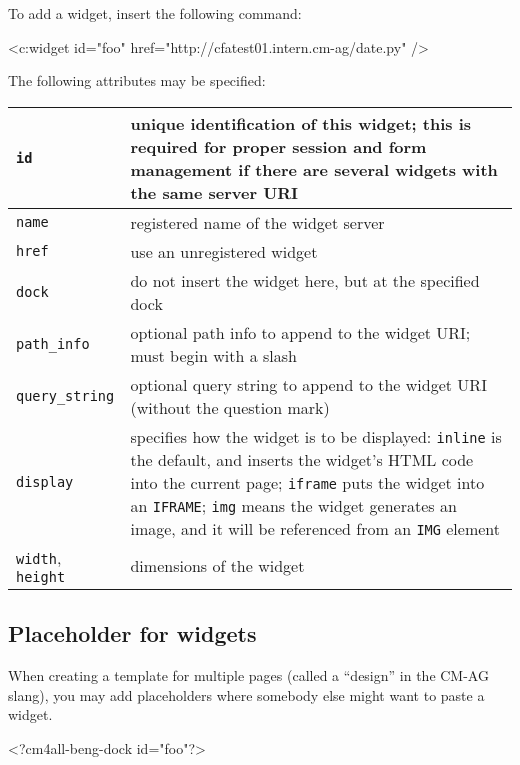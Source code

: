 \documentclass[a4paper,12pt]{article}
\begin{document}
To add a widget, insert the following command:

\begin{verbatim*}
<c:widget id="foo" href="http://cfatest01.intern.cm-ag/date.py" />
\end{verbatim*}

The following attributes may be specified:

\begin{tabular}{|l|p{8cm}|}
\hline
\texttt{id} & unique identification of this widget; this is required
for proper session and form management if there are several widgets
with the same server URI \\
\hline
\texttt{name} & registered name of the widget server \\
\hline
\texttt{href} & use an unregistered widget \\
\hline
\texttt{dock} & do not insert the widget here, but at the specified dock \\
\hline
\texttt{path\_info} & optional path info to append to the widget URI;
must begin with a slash \\
\hline
\texttt{query\_string} & optional query string to append to the widget
URI (without the question mark) \\
\hline
\texttt{display} & specifies how the widget is to be displayed:
\texttt{inline} is the default, and inserts the widget's HTML code
into the current page; \texttt{iframe} puts the widget into an
\texttt{IFRAME}; \texttt{img} means the widget generates an image, and
it will be referenced from an \texttt{IMG} element \\
\hline
\texttt{width}, \texttt{height} & dimensions of the widget \\
\hline
\end{tabular}


\subsection{Placeholder for widgets}

When creating a template for multiple pages (called a ``design'' in
the CM-AG slang), you may add placeholders where somebody else might
want to paste a widget.

\begin{verbatim*}
<?cm4all-beng-dock id="foo"?>
\end{verbatim*}
\end{document}
